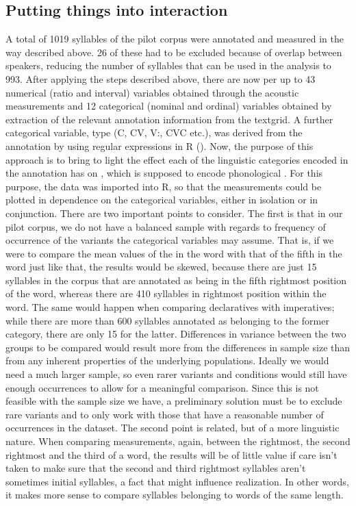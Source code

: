 \documentclass[output=paper]{LSP/langsci}
\begin{document}
\subsection{Putting things into interaction}
A total of 1019 syllables of the pilot corpus were annotated and measured in the way described above. 26 of these had to be excluded because of overlap between speakers, reducing the number of syllables that can be used in the analysis to 993. After applying the steps described above, there are now per  up to 43 numerical (ratio and interval) variables obtained through the acoustic measurements and 12 categorical (nominal and ordinal) variables obtained by extraction of the relevant annotation information from the textgrid. A further categorical variable,  type (C, CV, V\textipa:, CVC etc.), was derived from the  annotation by using regular expressions in {R} (\citealt{Rtool}). Now, the purpose of this approach is to bring to light the effect each of the linguistic categories encoded in the annotation has on , which is supposed to encode phonological . For this purpose, the data was imported into {R}, so that the measurements could be plotted in dependence on the categorical variables, either in isolation or in conjunction. There are two important points to consider. The first is that in our pilot corpus, we do not have a balanced sample with regards to frequency of occurrence of the variants the categorical variables may assume. That is, if we were to compare the mean values of the  in the word with that of the fifth  in the word just like that, the results would be skewed, because there are just 15 syllables in the corpus that are annotated as being in the fifth rightmost position of the word, whereas there are 410 syllables in rightmost position within the word. The same would happen when comparing declaratives with imperatives; while there are more than 600 syllables annotated as belonging to the former category, there are only 15 for the latter. Differences in variance between the two groups to be compared would result more from the differences in sample size than from any inherent properties of the underlying populations. Ideally we would need a much larger sample, so even rarer variants and conditions would still have enough occurrences to allow for a meaningful comparison. Since this is not feasible with the sample size we have, a preliminary solution must be to exclude rare variants and to only work with those that have a reasonable number of occurrences in the dataset. The second point is related, but of a more linguistic nature. When comparing measurements, again, between the rightmost, the second rightmost and the third  of a word, the results will be of little value if care isn’t taken to make sure that the second and third rightmost syllables aren’t sometimes initial syllables, a fact that might influence  realization. In other words, it makes more sense to compare syllables belonging to words of the same length. 
\end{document}

